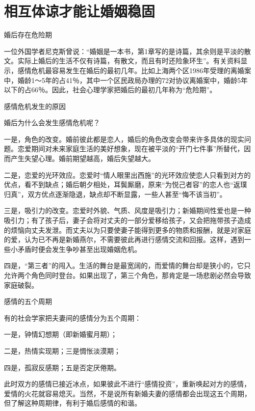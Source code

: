 \documentclass[12pt,UTF8,openany]{ctexbook}
\begin{document}
\chapter{相互体谅才能让婚姻稳固}


婚后存在危险期


一位外国学者尼克斯曾说：“婚姻是一本书，第1章写的是诗篇，其余则是平淡的散文。实际上婚后的生活不仅有诗篇，有散文，而且有时还险象环生”。有关资料显示，感情危机最容易发生在婚后的最初几年。比如上海两个区1986年受理的离婚案中，婚龄1～5年的占41％，其中一个区民政局办理的72对协议离婚案中，婚龄5年以下的占66％。因此，社会心理学家把婚后的最初几年称为“危险期”。





感情危机发生的原因


婚后为什么会发生感情危机呢？

一是，角色的改变。婚前彼此都是恋人，婚后的角色改变会带来许多具体的现实问题。恋爱期间对未来家庭生活的美好想象，现在被平淡的“开门七件事”所替代，因而产生失望心理。婚前期望越高，婚后失望越大。

二是，恋爱的光环效应。恋爱时“情人眼里出西施”的光环效应使恋人只看到对方的优点，看不到缺点；婚后朝夕相处，耳鬓厮磨，原来“为悦己者容”的恋人也“返璞归真”，双方优点逐渐隐退，缺点却不断显露，一些人甚至“悔不该当初”。

三是，吸引力的改变。恋爱时外貌、气质、风度是吸引力；新婚期间性爱也是一种吸引力；有了孩子后，妻子会将对丈夫的一部分爱移给孩子，又会把拖带孩子造成的烦恼向丈夫发泄。而丈夫以为只要使妻子能得到更多的物质和报酬，就是对家庭的爱，认为已不再是新婚燕尔，不需要彼此再进行感情交流和回报。这样，遇到一些小矛盾时便会发生争吵甚至出现婚姻危机。

四是，“第三者”的闯入。生活的舞台是最宽阔的，而爱情的舞台却是狭小的，它只允许两个角色同时登台。如果出现了，第三个角色，那肯定是一场悲剧必然会导致家庭破裂。





感情的五个周期


有的社会学家把夫妻间的感情分为五个周期：

一是，钟情幻想期（即新婚蜜月期）；

二是，热情实现期；三是惆怅淡漠期；

四是，孤寂反感期；五是否定厌倦期。

此时双方的感情已接近冰点，如果彼此不进行“感情投资”，重新唤起对方的感情，爱情的火花就容易熄灭。当然，不是说所有新婚夫妻的感情都会出现这五个周期，但了解这种周期律，有利于婚后感情的和谐。
\end{document}
